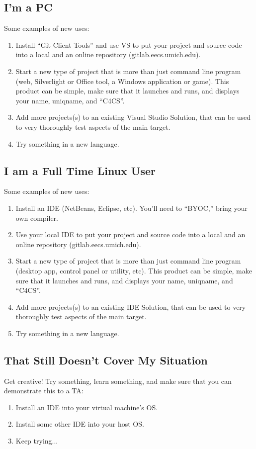 \documentclass{article}
\begin{document}
\subsection{I'm a PC}
Some examples of new uses:
\begin{enumerate}
\item Install ``Git Client Tools'' and use VS to put your project and source
      code into a local and an online repository (gitlab.eecs.umich.edu).
\item Start a new type of project that is more than just command line program
      (web, Silverlight or Office tool, a Windows application or game). This
      product can be simple, make sure that it launches and runs, and displays
      your name, uniqname, and ``C4CS''.
\item Add more projects(s) to an existing Visual Studio Solution, that can be
      used to very thoroughly test aspects of the main target.
\item Try something in a new language.
\end{enumerate}

\subsection{I am a Full Time Linux User}
Some examples of new uses:
\begin{enumerate}
\item Install an IDE (NetBeans, Eclipse, etc). You'll need to ``BYOC,'' bring
      your own compiler.
\item Use your local IDE to put your project and source code into a local and
      an online repository (gitlab.eecs.umich.edu).
\item Start a new type of project that is more than just command line program
      (desktop app, control panel or utility, etc). This product can be simple,
      make sure that it launches and runs, and displays your name, uniqname,
      and ``C4CS''.
\item Add more projects(s) to an existing IDE Solution, that can be used to
      very thoroughly test aspects of the main target.
\item Try something in a new language.
\end{enumerate}

\subsection{That Still Doesn't Cover My Situation}
Get creative! Try something, learn something, and make sure that you can demonstrate this to a TA:
\begin{enumerate}
\item Install an IDE into your virtual machine's OS.
\item Install some other IDE into your host OS.
\item Keep trying...
\end{enumerate}
\end{document}
